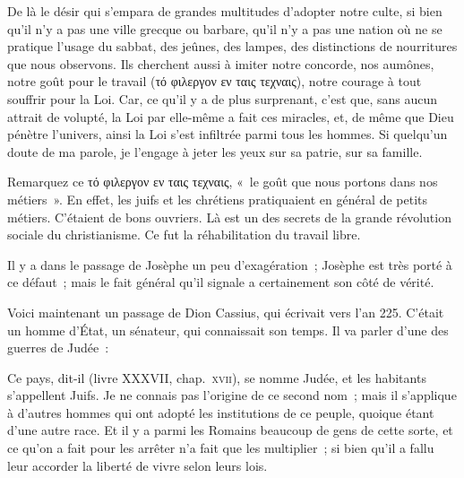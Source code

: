 \documentclass[french,twoside]{book} %
\newcommand\orgName[1]{#1}
\newcommand\persName[1]{#1}
\newcommand\placeName[1]{#1}
\newenvironment{quoteblock}%
  {\begin{quoting}}
  {\end{quoting}}
\newenvironment{quotebar}{%
    \def\FrameCommand{{\color{rubric!10!}\vrule width 0.5em} \hspace{0.9em}}%
    \def\OuterFrameSep{\itemsep} %
    \MakeFramed {\advance\hsize-\width \FrameRestore}
  }%
  {%
    \endMakeFramed
  }
\renewenvironment{quoteblock}%
  {%
    \savenotes
    \setstretch{0.9}
    \normalfont
    \begin{quotebar}
  }
  {%
    \end{quotebar}
    \spewnotes
  }
\begin{document}
\begin{quoteblock}
 \noindent De là le désir qui s’empara de grandes multitudes d’adopter notre culte, si bien qu’il n’y a pas une ville grecque ou barbare, qu’il n’y a pas une nation où ne se pratique l’usage du sabbat, des jeûnes, des lampes, des distinctions de nourritures que nous observons. Ils cherchent aussi à imiter notre concorde, nos aumônes, notre goût pour le travail (τό φιλεργον εν ταις τεχναις), notre courage à tout souffrir pour la Loi. Car, ce qu’il y a de plus surprenant, c’est que, sans aucun attrait de volupté, la Loi par elle-même a fait ces miracles, et, de même que {\persName Dieu} pénètre l’univers, ainsi la Loi s’est infiltrée parmi tous les hommes. Si quelqu’un doute de ma parole, je l’engage à jeter les yeux sur sa patrie, sur sa famille.
 \end{quoteblock}

\noindent Remarquez ce τό φιλεργον εν ταις τεχναις, « le goût que nous portons dans nos métiers ». En effet, les {\orgName juifs} et les {\orgName chrétiens} pratiquaient en général de petits métiers. C’étaient de bons ouvriers. Là est un des secrets de la grande révolution sociale du christianisme. Ce fut la réhabilitation du travail libre.\par
Il y a dans le passage de {\persName Josèphe} un peu d’exagération ; {\persName Josèphe} est très porté à ce défaut ; mais le fait général qu’il signale a certainement son côté de vérité.\par
Voici maintenant un passage de {\persName Dion Cassius}, qui écrivait vers l’an 225. C’était un homme d’État, un sénateur, qui connaissait son temps. Il va parler d’une des guerres de {\placeName Judée} :\par

\begin{quoteblock}
 \noindent Ce pays, dit-il (livre XXXVII, chap. \textsc{xvii}), se nomme {\placeName Judée}, et les habitants s’appellent {\orgName Juifs}. Je ne connais pas l’origine de ce second nom ; mais il s’applique à d’autres hommes qui ont adopté les institutions de ce peuple, quoique étant d’une autre race. Et il y a parmi les Romains beaucoup de gens de cette sorte, et ce qu’on a fait pour les arrêter n’a fait que les multiplier ; si bien qu’il a fallu leur accorder la liberté de vivre selon leurs lois.
 \end{quoteblock}
\end{document}

